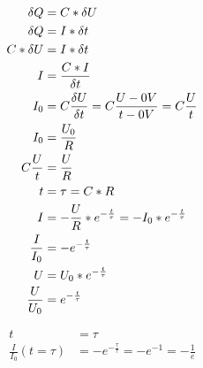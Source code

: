         \begin{align}
            \delta Q &= C * \delta U \\                                                                 %
            \delta Q &= I * \delta t \\                                                                 %
            C * \delta U &= I * \delta t \\                                                             %
            I &= \frac{C * I}{\delta t} \\                                                              %
            I_0 &= C \frac{\delta U}{\delta t} = C \frac{U - 0V}{t - 0V}=C\frac{U}{t} \\                %
            I_0 &= \frac{U_0}{R} \\                                                                     %
            C\frac{U}{t} &= \frac{U}{R} \\                                                              %
            t &= \tau = C*R \\                                                                          %
            I &= -\frac{U}{R} * e\textsuperscript{$-\frac{t}{\tau}$} = - I_0 * e^{-\frac{t}{\tau}} \\      %
            \frac{I}{I_0} &= - e^{-\frac{t}{\tau}} \\                                                     %
            U &= U_0 * e^{-\frac{t}{\tau}} \\                                                     %
            \frac{U}{U_0} &= e^{-\frac{t}{\tau}}                                                    %
        \end{align}
        
        \begin{align}
            t &= \tau \\                                                                                %
            \frac{I}{I_0} (t = \tau) &= - e^{-\frac{\tau}{\tau}} = - e^{-1} = - \frac{1}{e}                   %
        \end{align}
        
